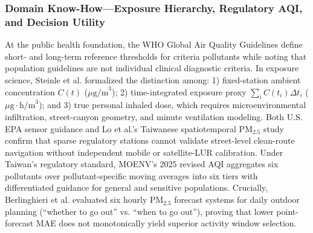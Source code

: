\subsubsection{Domain Know-How---Exposure Hierarchy, Regulatory AQI, and Decision Utility}
At the public health foundation, the WHO Global Air Quality Guidelines \cite{who2021,who2024} define short- and long-term reference thresholds for criteria pollutants while noting that population guidelines are not individual clinical diagnostic criteria. In exposure science, Steinle et al. \cite{steinle2018} formalized the distinction among: 1) fixed-station ambient concentration $C(t)$ ($\mu\text{g/m}^3$); 2) time-integrated exposure proxy $\sum_i C(t_i)\Delta t_i$ ($\mu\text{g}\cdot\text{h/m}^3$); and 3) true personal inhaled dose, which requires microenvironmental infiltration, street-canyon geometry, and minute ventilation modeling. Both U.S. EPA sensor guidance \cite{epa2024} and Lo et al.'s Taiwanese spatiotemporal $\text{PM}_{2.5}$ study \cite{lo2025} confirm that sparse regulatory stations cannot validate street-level clean-route navigation without independent mobile or satellite-LUR calibration. Under Taiwan's regulatory standard, MOENV's 2025 revised AQI \cite{moenv2025aqi} aggregates six pollutants over pollutant-specific moving averages into six tiers with differentiated guidance for general and sensitive populations. Crucially, Berlinghieri et al. \cite{berlinghieri2026} evaluated six hourly $\text{PM}_{2.5}$ forecast systems for daily outdoor planning (``whether to go out'' vs. ``when to go out''), proving that lower point-forecast MAE does not monotonically yield superior activity window selection.

